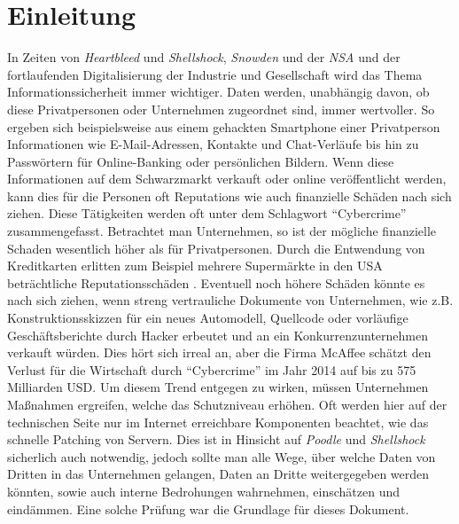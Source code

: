 \chapter{Einleitung}
In Zeiten von \textit{Heartbleed}\cite{Heartbleed} und  \textit{Shellshock}\cite{Shellshock}, \textit{Snowden} und der \textit{NSA}\cite{Snowden} und der fortlaufenden Digitalisierung der Industrie und Gesellschaft wird das Thema Informationssicherheit immer wichtiger. Daten werden, unabhängig davon, ob diese Privatpersonen oder Unternehmen zugeordnet sind, immer wertvoller. So ergeben sich beispielsweise aus einem gehackten Smartphone einer Privatperson Informationen wie E-Mail-Adressen, Kontakte und Chat-Verläufe bis hin zu Passwörtern für Online-Banking oder persönlichen Bildern. Wenn diese Informationen auf dem Schwarzmarkt verkauft oder online veröffentlicht werden, kann dies für die Personen oft Reputations wie auch finanzielle Schäden nach sich ziehen. Diese Tätigkeiten werden oft unter dem Schlagwort "`Cybercrime"' zusammengefasst. Betrachtet man Unternehmen, so ist der mögliche finanzielle Schaden wesentlich höher als für Privatpersonen. Durch die Entwendung von Kreditkarten erlitten zum Beispiel mehrere Supermärkte in den USA beträchtliche Reputationsschäden \cite{HackKreditkarten}\cite{HackKreditkarten2}. Eventuell noch höhere Schäden könnte es nach sich ziehen, wenn streng vertrauliche Dokumente von Unternehmen, wie z.B. Konstruktionsskizzen für ein neues Automodell, Quellcode oder vorläufige Geschäftsberichte durch Hacker erbeutet und an ein Konkurrenzunternehmen verkauft würden. Dies hört sich irreal an, aber die Firma McAffee schätzt den Verlust für die Wirtschaft durch "`Cybercrime"' im Jahr 2014 auf bis zu 575 Milliarden USD\cite{McAffee}. 
Um diesem Trend entgegen zu wirken, müssen Unternehmen Maßnahmen ergreifen, welche das Schutzniveau erhöhen. Oft werden hier auf der technischen Seite nur im Internet erreichbare Komponenten beachtet, wie das schnelle Patching von Servern. Dies ist in Hinsicht auf  \textit{Poodle}\cite{Poodle} und \textit{Shellshock}\cite{Shellshock} sicherlich auch notwendig, jedoch sollte man alle Wege, über welche Daten von Dritten in das Unternehmen gelangen, Daten an Dritte weitergegeben werden könnten, sowie auch interne Bedrohungen wahrnehmen, einschätzen und eindämmen. Eine solche Prüfung war die Grundlage für dieses Dokument.